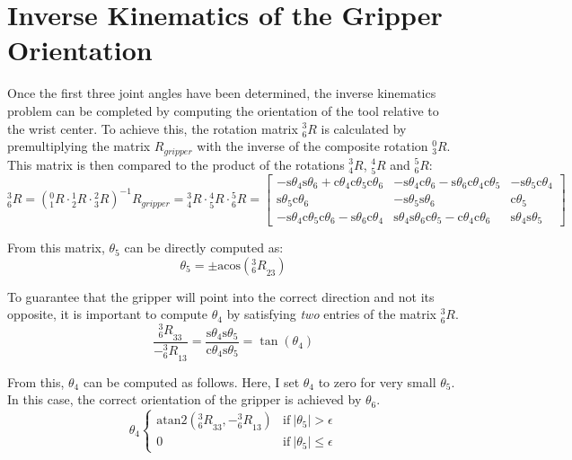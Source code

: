 \documentclass[twoside]{article}
\renewcommand{\c}{\text{c}}
\newcommand{\s}{\text{s}}
\newcommand{\R}[2]{\mbox{$_{#2}^{#1}{R}$}}
\newcommand{\acos}{\text{acos}}
\begin{document}
\section{Inverse Kinematics of the Gripper Orientation}
Once the first three joint angles have been determined, the inverse kinematics problem can be
completed by computing the orientation of the tool relative to the wrist center. To achieve
this, the rotation matrix $\R{3}{6}$ is calculated by premultiplying the matrix $R_{gripper}$
with the inverse of the composite rotation $\R{0}{3}$. This matrix is then compared to the
product of the rotations $\R{3}{4}$, $\R{4}{5}$ and $\R{5}{6}$:
\begin{equation}
  \R{3}{6} = (\R{0}{1}\cdot \R{1}{2}\cdot \R{2}{3})^{-1} R_{gripper} = \R{3}{4} \cdot \R{4}{5} \cdot \R{5}{6} =
  \begin{bmatrix}
    -\s\theta_4 \s\theta_6 + \c\theta_4\c\theta_5 \c\theta_6 & -\s\theta_4 \c\theta_6 - \s\theta_6 \c\theta_4 \c\theta_5 & -\s\theta_5 \c\theta_4 \\
                                        \s\theta_5 \c\theta_6 &                                    -\s\theta_5 \s\theta_6 &             \c\theta_5 \\
    -\s\theta_4 \c\theta_5 \c\theta_6 - \s\theta_6 \c\theta_4 &  \s\theta_4 \s\theta_6 \c\theta_5 - \c\theta_4 \c\theta_6 &  \s\theta_4 \s\theta_5
  \end{bmatrix}
\end{equation}

From this matrix, $\theta_5$ can be directly computed as:
\begin{equation}
  \theta_5 = \pm\acos(\R{3}{6}_{23})
\end{equation}

To guarantee that the gripper will point into the correct direction and not its opposite,
it is important to compute $\theta_4$  by satisfying \emph{two} entries of the matrix
$\R{3}{6}$.
\begin{equation}
  \frac{\R{3}{6}_{33}}{-\R{3}{6}_{13}} = \frac{\s\theta_4\s\theta_5}{\c\theta_4\s\theta_5} = \tan(\theta_4)
\end{equation}

From this, $\theta_4$ can be computed as follows. Here, I set $\theta_4$ to zero for very small
$\theta_5$. In this case, the correct orientation of the gripper is achieved by $\theta_6$.
\begin{equation}
  \theta_4
  \begin{cases}
    \text{atan2}\left(\R{3}{6}_{33}, -\R{3}{6}_{13}\right) & \text{if}\ |\theta_5| > \epsilon \\
    0                                           & \text{if}\ |\theta_5| \leq \epsilon
  \end{cases}
\end{equation}
\end{document}
